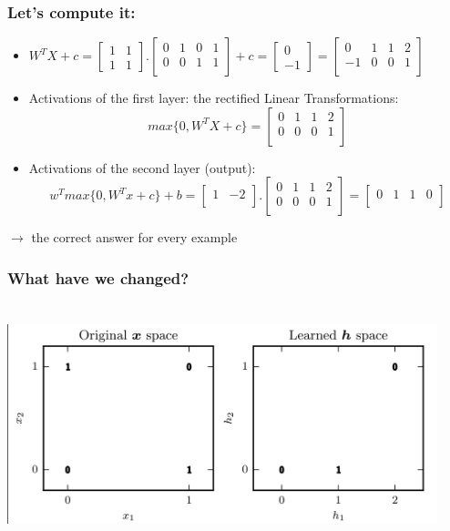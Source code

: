 \documentclass{beamer}
\begin{document}
\begin{frame}
	\frametitle{Let's compute it: }
	\begin{itemize}
		\item $ W^TX + c = \begin{bmatrix} 1 & 1\\
						1 & 1
				\end{bmatrix} .   \begin{bmatrix}
		0 & 1 & 0 & 1\\
	0 & 0 & 1 & 1 \\
\end{bmatrix} + c = \begin{bmatrix}
0\\
-1 
\end{bmatrix} =  \begin{bmatrix}
		0 & 1 & 1 & 2\\
	-1 & 0 & 0 & 1 \\
\end{bmatrix} $
\item Activations of the first layer: the rectified Linear Transformations:
	$$ max\{0,W^TX + c\} =\begin{bmatrix}
		0 & 1 & 1 & 2\\
	0 & 0 & 0 & 1 \\
\end{bmatrix}  $$
\item Activations of the second layer (output): 
	$$  w^Tmax\{0,W^Tx + c\} + b = \begin{bmatrix}
		1 & -2\\
\end{bmatrix}. \begin{bmatrix}
		0 & 1 & 1 & 2\\
	0 & 0 & 0 & 1 \\
\end{bmatrix} = \begin{bmatrix}
		0 & 1 & 1 & 0\\
\end{bmatrix}$$
	\end{itemize}
	$\rightarrow$ the correct answer for every example
\end{frame}
\begin{frame}
	\frametitle{What have we changed?}
	\includegraphics[width=125mm,height =70mm]{xor_graph2.png}
	
\end{frame}
\end{document}
